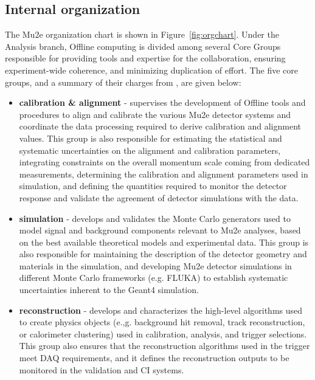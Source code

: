 \subsection{Internal organization}
The Mu2e organization chart is shown in Figure~\ref{fig:orgchart}. Under the Analysis branch, Offline computing is divided among several Core Groups responsible for providing tools and expertise for the collaboration, ensuring experiment-wide coherence, and minimizing duplication of effort. The five core groups, and a summary of their charges from \cite{corecharge}, are given below:

\begin{itemize}

\item[] {\bf calibration \& alignment} - supervises the development of Offline tools and procedures to align and calibrate the various Mu2e detector systems and coordinate the data processing required to derive calibration and alignment values. This group is also responsible for estimating the statistical and systematic uncertainties on the alignment and calibration parameters, integrating constraints on the overall momentum scale coming from dedicated measurements, determining the calibration and alignment parameters used in simulation, and defining the quantities required to monitor the detector response and validate the agreement of detector simulations with the data.

\item[] {\bf simulation} - develops and validates the Monte Carlo generators used to model signal and background components relevant to Mu2e analyses, based on the best available theoretical models and experimental data. This group is also responsible for maintaining the description of the detector geometry and materials in the simulation, and developing Mu2e detector simulations in different Monte Carlo frameworks (e.g. FLUKA) to establish systematic uncertainties inherent to the Geant4 simulation.

\item[] {\bf reconstruction} - develops and characterizes the high-level algorithms used to create physics objects (e.,g. background hit removal, track reconstruction, or calorimeter clustering) used in calibration, analysis, and trigger selections. This group also ensures that the reconstruction algorithms used in the trigger meet DAQ requirements, and it defines the reconstruction outputs to be monitored in the validation and CI systems. 


\end{itemize}
